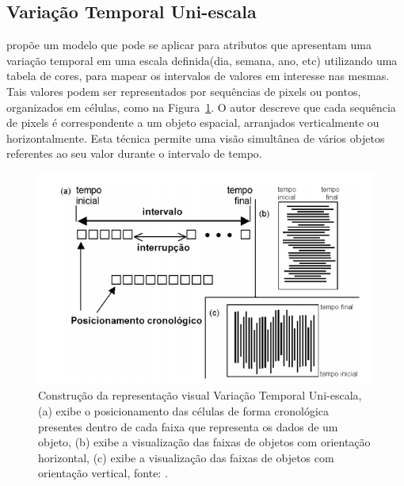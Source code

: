 \documentclass[article,11pt,oneside,a4paper]{abntex2} %
\begin{document}
	\subsection{Variação Temporal Uni-escala}
		\hspace{13pt}
	 propõe um modelo que pode se aplicar para atributos que apresentam uma variação temporal em uma escala definida(dia, semana, ano, etc) utilizando uma tabela de cores, para mapear os intervalos de valores em interesse nas mesmas. Tais valores podem ser representados por sequências de pixels ou pontos, organizados em células, como na Figura~\ref{fig_uni}. O autor descreve que cada sequência de pixels é correspondente a um objeto espacial, arranjados verticalmente ou horizontalmente. Esta técnica permite uma visão simultânea de vários objetos referentes ao seu valor durante o intervalo de tempo.
	
	\begin{figure}[!h]
		{\centering
			\includegraphics[width=1\textwidth]{figuras/uni.png}
			\caption{Construção da representação visual Variação Temporal Uni-escala, (a) exibe o posicionamento das células de forma cronológica presentes dentro de cada faixa que representa os dados de um objeto, (b) exibe a visualização das faixas de objetos com orientação horizontal, (c) exibe a visualização das faixas de objetos com orientação vertical,  fonte: \cite{shimabukuro}.}
			\label{fig_uni}
		}
	\end{figure}
	
\end{document}
